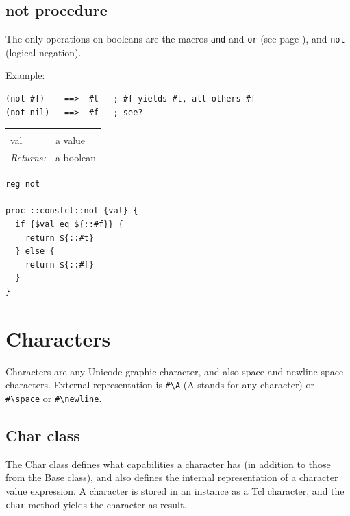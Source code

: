 \documentclass[twoside]{report}
\begin{document}
\subsection{not procedure}
\label{not-procedure}

The only operations on booleans are the macros \texttt{and} and \texttt{or} (see page \pageref{macros}), and \texttt{not} (logical negation).

Example:

\begin{verbatim}
(not #f)    ==>  #t   ; #f yields #t, all others #f
(not nil)   ==>  #f   ; see?
\end{verbatim}

\noindent\begin{tabular}{ |p{1.9cm} p{8cm}| }
\hline
\rowcolor[HTML]{CCCCCC} \multicolumn{2}{|l|}{\bf not (public)} \\
val & a value \\
\textit{Returns:} & a boolean \\
\hline
\end{tabular}

\begin{lstlisting}
reg not

proc ::constcl::not {val} {
  if {$val eq ${::#f}} {
    return ${::#t}
  } else {
    return ${::#f}
  }
}
\end{lstlisting}

\section{Characters}
\label{characters}

Characters are any Unicode graphic character, and also space and newline space characters. External representation is \texttt{\#\textbackslash A} (A stands for any character) or \texttt{\#\textbackslash space} or \texttt{\#\textbackslash newline}.

\subsection{Char class}
\label{char-class}

The Char class defines what capabilities a character has (in addition to those from the Base class), and also defines the internal representation of a character value expression. A character is stored in an instance as a Tcl character, and the \texttt{char} method yields the character as result.
\end{document}
